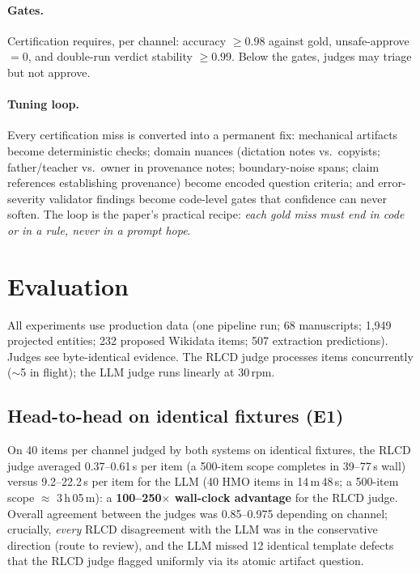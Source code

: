 \documentclass{llncs}
\begin{document}
\paragraph{Gates.}
Certification requires, per channel: accuracy $\geq 0.98$ against gold,
unsafe-approve $= 0$, and double-run verdict stability $\geq 0.99$.
Below the gates, judges may triage but not approve.

\paragraph{Tuning loop.}
Every certification miss is converted into a permanent fix: mechanical
artifacts become deterministic checks; domain nuances (dictation notes vs.\
copyists; father/teacher vs.\ owner in provenance notes; boundary-noise
spans; claim references establishing provenance) become encoded question
criteria; and error-severity validator findings become code-level gates
that confidence can never soften. The loop is the paper's practical
recipe: \emph{each gold miss must end in code or in a rule, never in a
prompt hope}.

\section{Evaluation}
\label{sec:eval}

All experiments use production data (one pipeline run; 68 manuscripts;
1{,}949 projected entities; 232 proposed Wikidata items; 507 extraction
predictions). Judges see byte-identical evidence. The RLCD judge processes
items concurrently ($\sim$5 in flight); the LLM judge runs linearly at
30\,rpm.

\subsection{Head-to-head on identical fixtures (E1)}
\label{sec:eval:e1}

On 40 items per channel judged by both systems on identical fixtures, the
RLCD judge averaged 0.37--0.61\,s per item (a 500-item scope completes in
39--77\,s wall) versus 9.2--22.2\,s per item for the LLM (40 HMO items in
14\,m\,48\,s; a 500-item scope $\approx$ 3\,h\,05\,m): a
\textbf{100--250$\times$ wall-clock advantage} for the RLCD judge.
Overall agreement between the judges was 0.85--0.975 depending on channel;
crucially, \emph{every} RLCD disagreement with the LLM was in the
conservative direction (route to review), and the LLM missed 12
identical template defects that the RLCD judge flagged uniformly via its
atomic artifact question.
\end{document}
